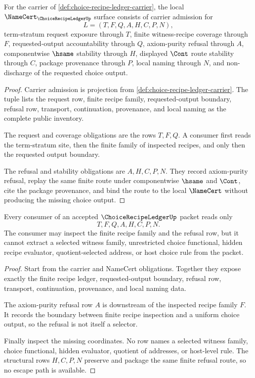 \begin{theorem}
\label{thm:choice-recipe-ledger-namecert-obligations}
For the carrier of \autoref{def:choice-recipe-ledger-carrier}, the local $\NameCert_{\ChoiceRecipeLedgerUp}$ surface consists of carrier admission for
$$
L=(T,F,Q,A,H,C,P,N),
$$
term-stratum request exposure through $T$, finite witness-recipe coverage through $F$, requested-output accountability through $Q$, axiom-purity refusal through $A$, componentwise $\hsame$ stability through $H$, displayed $\Cont$ route stability through $C$, package provenance through $P$, local naming through $N$, and non-discharge of the requested choice output.
\end{theorem}
\begin{proof}
Carrier admission is projection from \autoref{def:choice-recipe-ledger-carrier}. The tuple lists the request row, finite recipe family, requested-output boundary, refusal row, transport, continuation, provenance, and local naming as the complete public inventory.

The request and coverage obligations are the rows $T,F,Q$. A consumer first reads the term-stratum site, then the finite family of inspected recipes, and only then the requested output boundary.

The refusal and stability obligations are $A,H,C,P,N$. They record axiom-purity refusal, replay the same finite route under componentwise $\hsame$ and $\Cont$, cite the package provenance, and bind the route to the local $\NameCert$ without producing the missing choice output.
\end{proof}

\begin{theorem}
\label{thm:choice-recipe-ledger-non-escape}
Every consumer of an accepted $\ChoiceRecipeLedgerUp$ packet reads only
$$
T,F,Q,A,H,C,P,N.
$$
The consumer may inspect the finite recipe family and the refusal row, but it cannot extract a selected witness family, unrestricted choice functional, hidden recipe evaluator, quotient-selected address, or host choice rule from the packet.
\end{theorem}
\begin{proof}
Start from the carrier and NameCert obligations. Together they expose exactly the finite recipe ledger, requested-output boundary, refusal row, transport, continuation, provenance, and local naming data.

The axiom-purity refusal row $A$ is downstream of the inspected recipe family $F$. It records the boundary between finite recipe inspection and a uniform choice output, so the refusal is not itself a selector.

Finally inspect the missing coordinates. No row names a selected witness family, choice functional, hidden evaluator, quotient of addresses, or host-level rule. The structural rows $H,C,P,N$ preserve and package the same finite refusal route, so no escape path is available.
\end{proof}

